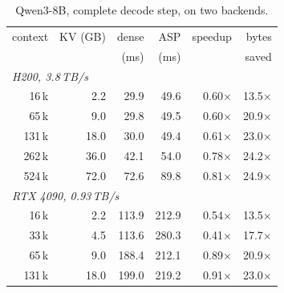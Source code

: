 \documentclass[sigconf,nonacm,11pt]{acmart}
\begin{document}
\begin{table}[t]
\caption{Qwen3-8B, complete decode step, on two backends.}
\label{tab:e2e}
\small
\setlength{\tabcolsep}{4.5pt}
\begin{tabular}{rrrrrr}
\toprule
context & KV (GB) & dense & ASP & speedup & bytes \\
        &         & (ms)  & (ms) &         & saved \\
\midrule
\multicolumn{6}{l}{\emph{H200, 3.8\,TB/s}}\\
16\,k  &  2.2 & 29.9 & 49.6 & 0.60$\times$ & 13.5$\times$ \\
65\,k  &  9.0 & 29.8 & 49.5 & 0.60$\times$ & 20.9$\times$ \\
131\,k & 18.0 & 30.0 & 49.4 & 0.61$\times$ & 23.0$\times$ \\
262\,k & 36.0 & 42.1 & 54.0 & 0.78$\times$ & 24.2$\times$ \\
524\,k & 72.0 & 72.6 & 89.8 & 0.81$\times$ & 24.9$\times$ \\
\midrule
\multicolumn{6}{l}{\emph{RTX 4090, 0.93\,TB/s}}\\
16\,k  &  2.2 & 113.9 & 212.9 & 0.54$\times$ & 13.5$\times$ \\
33\,k  &  4.5 & 113.6 & 280.3 & 0.41$\times$ & 17.7$\times$ \\
65\,k  &  9.0 & 188.4 & 212.1 & 0.89$\times$ & 20.9$\times$ \\
131\,k & 18.0 & 199.0 & 219.2 & 0.91$\times$ & 23.0$\times$ \\
\bottomrule
\end{tabular}
\end{table}
\end{document}
